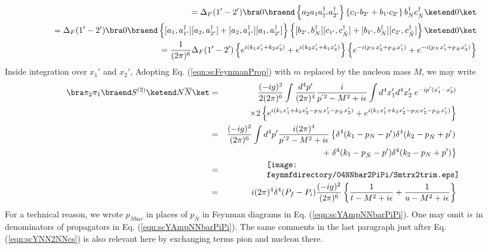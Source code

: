 \begin{eqnarray}
&&
=
\Delta_F(1' - 2')
\bra 0 \braend
\left\{
 a_2 a_1 a_{1'}^\dagger a_{2'}^\dagger
\right\}
\left\{
c_{1'}b_{2'} + b_{1'}c_{2'} 
\right\}
b_{N}^\dagger c_{\bar{N}}^\dagger 
\ketend 0 \ket
\nonumber\\
&&
=
\Delta_F(1' - 2')
\bra 0 \braend
\left\{
[a_1, a_{1'}^\dagger] [a_2, a_{2'}^\dagger]
+
[a_2, a_{1'}^\dagger] [a_1, a_{2'}^\dagger]
\right\}
\left\{
[b_{2'}, b_{N}^\dagger]  [c_{1'},  c_{\bar{N}}^\dagger ]
+ [b_{1'}, b_{N}^\dagger]
[c_{2'} ,  c_{\bar{N}}^\dagger ]
\right\}
\ketend 0 \ket
\nonumber\\
&&
=
\frac{1}{(2\pi)^6} \Delta_F(1' - 2')
\left\{
e^{i(k_1 x_1' + k_2 x_2')}
+
e^{i(k_2 x_1' + k_1 x_2')}
\right\}
\left\{
e^{-i(p_N x_2' + p_{\bar{N}} x_1')}
+
e^{-i(p_N x_1' + p_{\bar{N}} x_2')}
\right\}
\nonumber\\
\end{eqnarray}
Inside integration over $x_1'$ and $x_2'$, 
Adopting Eq. (\ref{eqn:scFeynmanProp}) with $m$ replaced by the nucleon mass $M$, we may write
\begin{eqnarray}
\bra \pi_2 \pi_1  \braend
S^{(2)}
\ketend N \overline{N} \ket
&=&
\frac{(-ig)^2}{2 (2\pi)^6}
\int \frac{d^4 p'}{(2\pi)^4} \frac{i}{p^{'2} - M^2 + i\epsilon}
\int d^4 x_1' d^4 x_2'\; e^{-ip' (x_1' - x_2')}
\nonumber\\
&&
\times 2
\left\{
e^{i(k_1 x_1' + k_2 x_2' -p_N x_1' - p_{\bar{N}} x_2')}
+
e^{i(k_1 x_1' + k_2 x_2' -p_N x_2' - p_{\bar{N}} x_1')}
\right\}
\nonumber\\
&=&
\frac{(-ig)^2}{(2\pi)^6}
\int d^4 p'  \frac{i (2\pi)^4}{p^{'2} - M^2 + i\epsilon}
\left\{
\delta^4 (k_1  -p_N - p' ) \delta^4( k_2 - p_{\bar{N}} + p')
\right.
\nonumber\\
&&
\hspace{40mm}
+
\left.
\delta^4( k_1 - p_{\bar{N}} - p') \delta^4 (k_2  -p_N + p' ) 
\right\}
\nonumber\\
&=&
\parbox{80mm}{
\texttt{[image: \\feynmfdirectory/04NNbar2PiPi/Smtrx2trim.eps]}
}
\nonumber\\
&=&
i (2\pi)^4 \delta^4(P_f - P_i)
\frac{(-ig)^2}{(2\pi)^6}
\left\{
\frac{1}{t - M^2 + i\epsilon}
+
\frac{1}{u - M^2 + i\epsilon}
\right\}
\label{eqn:scYAmpNNbarPiPi}
\end{eqnarray}
For a technical reason, we wrote $p_{Nbar}$ in places of $p_{\bar{N}}$ in 
Feynman diagrams in Eq. (\ref{eqn:scYAmpNNbarPiPi}).
One may omit $i\epsilon$ in denominators of propagators in Eq.  (\ref{eqn:scYAmpNNbarPiPi}).
The same comments in the last paragraph just after Eq. (\ref{eqn:scYNN2NNcs}) is 
also relevant here by exchanging terms pion and nucleon there.

